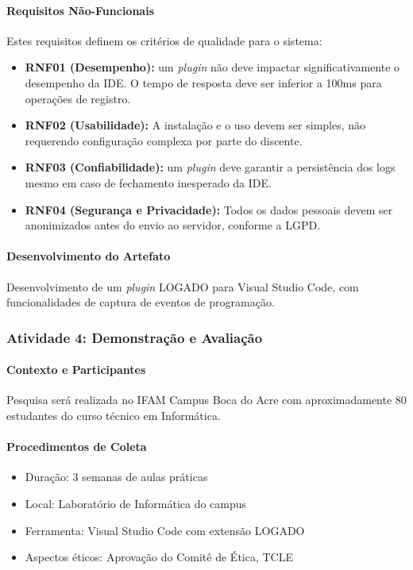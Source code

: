 \paragraph{Requisitos Não-Funcionais}
Estes requisitos definem os critérios de qualidade para o sistema:
\begin{itemize}
    \item \textbf{RNF01 (Desempenho):} um \textit{plugin} não deve impactar significativamente o desempenho da IDE. O tempo de resposta deve ser inferior a 100ms para operações de registro.
    \item \textbf{RNF02 (Usabilidade):} A instalação e o uso devem ser simples, não requerendo configuração complexa por parte do discente.
    \item \textbf{RNF03 (Confiabilidade):} um \textit{plugin} deve garantir a persistência dos logs mesmo em caso de fechamento inesperado da IDE.
    \item \textbf{RNF04 (Segurança e Privacidade):} Todos os dados pessoais devem ser anonimizados antes do envio ao servidor, conforme a LGPD.
\end{itemize}

\paragraph{Desenvolvimento do Artefato}
Desenvolvimento de um \textit{plugin} LOGADO para Visual Studio Code, com funcionalidades de captura de eventos de programação.

\subsubsection{Atividade 4: Demonstração e Avaliação}
\label{subsubsec:demonstracao-avaliacao}

\paragraph{Contexto e Participantes}
Pesquisa será realizada no IFAM Campus Boca do Acre com aproximadamente 80 estudantes do curso técnico em Informática.

\paragraph{Procedimentos de Coleta}
\begin{itemize}
    \item Duração: 3 semanas de aulas práticas
    \item Local: Laboratório de Informática do campus
    \item Ferramenta: Visual Studio Code com extensão LOGADO
    \item Aspectos éticos: Aprovação do Comitê de Ética, TCLE
\end{itemize}


